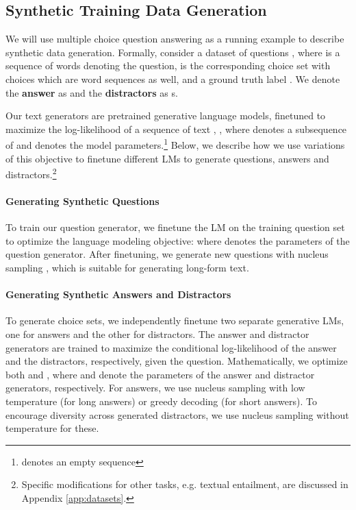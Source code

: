 \documentclass[11pt,a4paper]{article}
\begin{document}
\subsection{Synthetic Training Data Generation}
\label{sec:data-gen}

We will use multiple choice question answering as a running example to describe synthetic data generation.
Formally, consider a dataset of  questions ,  where  is a sequence of words denoting the  question,  is the corresponding choice set with  choices which are word sequences as well,
and a ground truth label . 
We denote the \textbf{answer} as  and the \textbf{distractors} as s.

Our text generators are pretrained generative language models, finetuned to maximize the log-likelihood of a sequence of text , ,
where  denotes a subsequence of 
and   denotes the model parameters.\footnote{  denotes an empty sequence}
Below, we describe how we use variations of this objective to finetune different LMs to generate questions, answers and distractors.\footnote{
Specific modifications for other tasks, e.g. textual entailment, are discussed in  Appendix \ref{app:datasets}.}




\paragraph{Generating Synthetic Questions} 
To train our question generator, we finetune the LM on the training question set  to optimize the language modeling objective: 
where  denotes the parameters of the question generator. After finetuning, we generate new questions with nucleus sampling \cite{holtzman2019curious}, which is suitable for generating long-form text.

\paragraph{Generating Synthetic Answers and Distractors} 
To generate choice sets, we independently finetune two separate generative LMs, one for answers and the other for distractors.        The answer and distractor generators are trained to maximize the conditional log-likelihood of the answer and the distractors, respectively, given the question.
Mathematically, we optimize both  and ,
where  and   denote the parameters of the answer and distractor generators, respectively.
For answers, we use nucleus sampling with low temperature (for long answers) or greedy decoding (for short answers). To encourage diversity across generated distractors, we use nucleus sampling without temperature for these.
\end{document}
